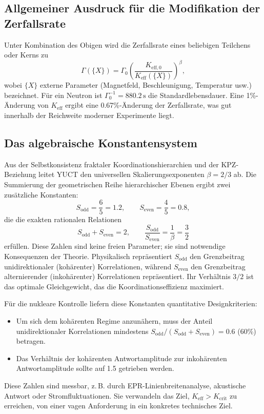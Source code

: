 \documentclass[12pt]{article}
\theoremstyle{remark}
\newcommand{\Keff}{K_{\mathrm{eff}}}
\newcommand{\Keffzero}{K_{\mathrm{eff},0}}
\newcommand{\Kcrit}{K_{\mathrm{crit}}}
\newcommand{\Sodd}{S_{\mathrm{odd}}}
\newcommand{\Seven}{S_{\mathrm{even}}}
\begin{document}
	\subsection{Allgemeiner Ausdruck für die Modifikation der Zerfallsrate}
	
	Unter Kombination des Obigen wird die Zerfallsrate eines beliebigen Teilchens oder Kerns zu
	\begin{equation}
		\Gamma(\{X\}) = \Gamma_0 \left( \frac{\Keffzero}{\Keff(\{X\})} \right)^{\beta},
		\label{eq:general-rate}
	\end{equation}
	wobei \(\{X\}\) externe Parameter (Magnetfeld, Beschleunigung, Temperatur usw.) bezeichnet. Für ein Neutron ist \(\Gamma_0^{-1} = 880.2\,\text{s}\) die Standardlebensdauer. Eine 1\%-Änderung von \(\Keff\) ergibt eine 0.67\%-Änderung der Zerfallsrate, was gut innerhalb der Reichweite moderner Experimente liegt.
	
	\subsection{Das algebraische Konstantensystem}
	\label{sec:algebraic}
	
	Aus der Selbstkonsistenz fraktaler Koordinationshierarchien und der KPZ-Beziehung leitet YUCT den universellen Skalierungsexponenten \(\beta = 2/3\) ab. Die Summierung der geometrischen Reihe hierarchischer Ebenen ergibt zwei zusätzliche Konstanten:
	\[
	\Sodd = \frac{6}{5}=1.2,\qquad \Seven = \frac{4}{5}=0.8,
	\]
	die die exakten rationalen Relationen
	\[
	\Sodd + \Seven = 2,\qquad \frac{\Sodd}{\Seven} = \frac{1}{\beta} = \frac{3}{2}
	\]
	erfüllen. Diese Zahlen sind keine freien Parameter; sie sind notwendige Konsequenzen der Theorie. Physikalisch repräsentiert \(\Sodd\) den Grenzbeitrag unidirektionaler (kohärenter) Korrelationen, während \(\Seven\) den Grenzbeitrag alternierender (inkohärenter) Korrelationen repräsentiert. Ihr Verhältnis \(3/2\) ist das optimale Gleichgewicht, das die Koordinationseffizienz maximiert.
	
	Für die nukleare Kontrolle liefern diese Konstanten quantitative Designkriterien:
	\begin{itemize}
		\item Um sich dem kohärenten Regime anzunähern, muss der Anteil unidirektionaler Korrelationen mindestens \(\Sodd/(\Sodd+\Seven)=0.6\) (60\%) betragen.
		\item Das Verhältnis der kohärenten Antwortamplitude zur inkohärenten Antwortamplitude sollte auf 1.5 getrieben werden.
	\end{itemize}
	Diese Zahlen sind messbar, z. B. durch EPR-Linienbreitenanalyse, akustische Antwort oder Stromfluktuationen. Sie verwandeln das Ziel, \(\Keff > \Kcrit\) zu erreichen, von einer vagen Anforderung in ein konkretes technisches Ziel.
	
\end{document}
